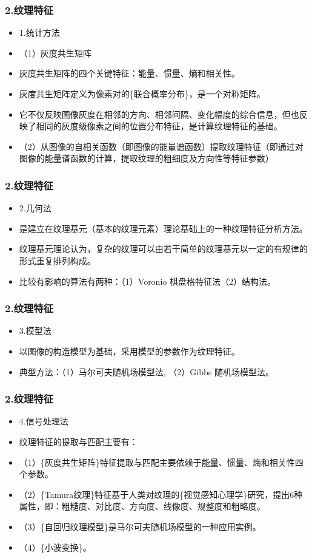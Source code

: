 \documentclass[notheorems,mathserif,table,compress]{beamer}  %
\begin{document}
\begin{frame}
  \frametitle{2.纹理特征}
  \begin{itemize}
  \item 1.统计方法
  \item（1）灰度共生矩阵
  \item 灰度共生矩阵的四个关键特征：能量、惯量、熵和相关性。
  \item 灰度共生矩阵定义为像素对的\{联合概率分布\}，是一个对称矩阵。
  \item 它不仅反映图像灰度在相邻的方向、相邻间隔、变化幅度的综合信息，但也反映了相同的灰度级像素之间的位置分布特征，是计算纹理特征的基础。
  \item（2）从图像的自相关函数（即图像的能量谱函数）提取纹理特征（即通过对图像的能量谱函数的计算，提取纹理的粗细度及方向性等特征参数）
  \end{itemize}
\end{frame}

\begin{frame}
  \frametitle{2.纹理特征}
  \begin{itemize}
  \item 2.几何法
  \item 是建立在纹理基元（基本的纹理元素）理论基础上的一种纹理特征分析方法。
  \item 纹理基元理论认为，复杂的纹理可以由若干简单的纹理基元以一定的有规律的形式重复排列构成。
  \item 比较有影响的算法有两种：（1）Voronio 棋盘格特征法（2）结构法。
  \end{itemize}
\end{frame}

\begin{frame}
  \frametitle{2.纹理特征}
  \begin{itemize}
  \item 3.模型法
  \item 以图像的构造模型为基础，采用模型的参数作为纹理特征。
  \item 典型方法：（1）马尔可夫随机场模型法,
（2）Gibbs 随机场模型法。
  \end{itemize}
\end{frame}

\begin{frame}
  \frametitle{2.纹理特征}
  \begin{itemize}
  \item 4.信号处理法
  \item 纹理特征的提取与匹配主要有：
  \item （1）\{灰度共生矩阵\}特征提取与匹配主要依赖于能量、惯量、熵和相关性四个参数。
  \item （2）\{Tamura纹理\}特征基于人类对纹理的\{视觉感知心理学\}研究，提出6种属性，即：粗糙度、对比度、方向度、线像度、规整度和粗略度。
  \item （3）\{自回归纹理模型\}是马尔可夫随机场模型的一种应用实例。
  \item （4）\{小波变换\}。
  \end{itemize}
\end{frame}
\end{document}

